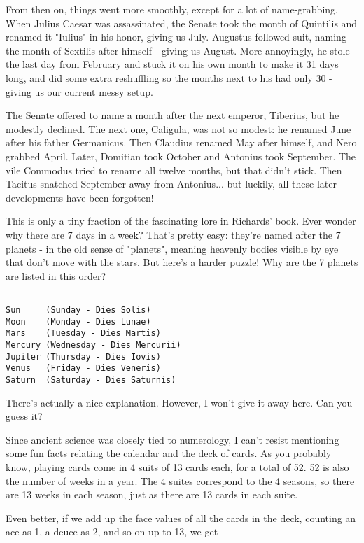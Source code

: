 From then on, things went more smoothly, except for a lot of name-grabbing.  
When Julius Caesar was assassinated, the Senate took the month of Quintilis 
and renamed it "Iulius" in his honor, giving us July.  Augustus followed
suit, naming the month of Sextilis after himself - giving us August. 
More annoyingly, he stole the last day from February and stuck it on his
own month to make it 31 days long, and did some extra reshuffling so the
months next to his had only 30 - giving us our current messy setup.

The Senate offered to name a month after the next emperor, Tiberius, but
he modestly declined.  The next one, Caligula, was not so modest: he
renamed June after his father Germanicus.  Then Claudius renamed May
after himself, and Nero grabbed April.  Later, Domitian took October and
Antonius took September.  The vile Commodus tried to rename all twelve
months, but that didn't stick.  Then Tacitus snatched September away
from Antonius... but luckily, all these later developments have been
forgotten!

This is only a tiny fraction of the fascinating lore in Richards' book. 
Ever wonder why there are 7 days in a week?  That's pretty easy: they're
named after the 7 planets - in the old sense of "planets", meaning
heavenly bodies visible by eye that don't move with the stars.  But
here's a harder puzzle!  Why are the 7 planets are listed in this order?


\begin{verbatim}

Sun     (Sunday - Dies Solis)
Moon    (Monday - Dies Lunae)
Mars    (Tuesday - Dies Martis)
Mercury (Wednesday - Dies Mercurii)
Jupiter (Thursday - Dies Iovis)
Venus   (Friday - Dies Veneris)
Saturn  (Saturday - Dies Saturnis)
\end{verbatim}
    
There's actually a nice explanation.  However, I won't give it away here.
Can you guess it?

Since ancient science was closely tied to numerology, I can't resist
mentioning some fun facts relating the calendar and the deck of cards. 
As you probably know, playing cards come in 4 suits of 13 cards each,
for a total of 52.  52 is also the number of weeks in a year.  The 4
suites correspond to the 4 seasons, so there are 13 weeks in each
season, just as there are 13 cards in each suite.  

Even better, if we add up the face values of all the cards in the deck,
counting an ace as 1, a deuce as 2, and so on up to 13, we get

